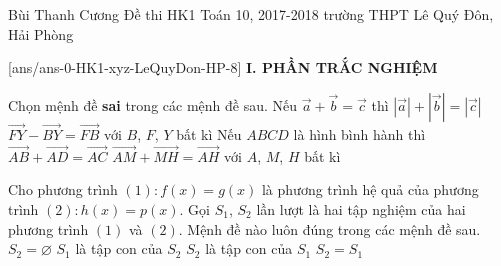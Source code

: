 \begin{name}
	{Bùi Thanh Cương}
	{Đề thi HK1 Toán 10, 2017-2018 trường THPT Lê Quý Đôn, Hải Phòng}
\end{name}
\setcounter{ex}{0}\setcounter{bt}{0}
[ans/ans-0-HK1-xyz-LeQuyDon-HP-8]
\noindent\textbf{I. PHẦN TRẮC NGHIỆM}
\begin{ex}%
	Chọn mệnh đề \textbf{sai} trong các mệnh đề sau.
	\choice
	{\True Nếu $\vec{a}+\vec{b}=\vec{c}$ thì $\left| \vec{a}\right|+\left| \vec{b}\right|=\left| \vec{c}\right|$}
	{$\vec{FY}-\vec{BY}=\vec{FB}$ với $B$, $F$, $Y$ bất kì}
	{Nếu $ABCD$ là hình bình hành thì $\vec{AB}+\vec{AD}=\vec{AC}$}
	{$\vec{AM}+\vec{MH}=\vec{AH}$  với $A$, $M$, $H$ bất kì}
\end{ex}

\begin{ex}%
	Cho phương trình $(1): f(x)=g(x)$ là phương trình hệ quả của phương trình $(2): h(x)=p(x)$. Gọi $S_1$, $S_2$ lần lượt là hai tập nghiệm của hai phương trình $(1)$ và $(2)$. Mệnh đề nào luôn đúng trong các mệnh đề sau.
	\choice
	{$S_2=\varnothing$ }
	{$S_1$ là tập con của $S_2$}
	{\True $S_2$ là tập con của $S_1$}
	{$S_2=S_1$}
\end{ex}

